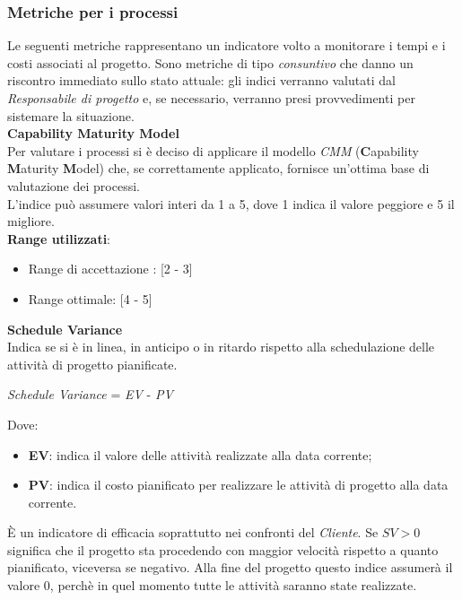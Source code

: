 \subsubsection{Metriche per i processi}\label{MetricheProc}
\hypertarget{metriche_processi}{}
Le seguenti metriche rappresentano un indicatore volto a monitorare i tempi e i costi associati al progetto. Sono metriche di tipo \textit{consuntivo} che danno un riscontro immediato sullo stato attuale: gli indici verranno valutati dal \textit{Responsabile di progetto} e, se necessario, verranno presi provvedimenti per sistemare la situazione.\\

\textbf{Capability Maturity Model}\\

Per valutare i processi si è deciso di applicare il modello \textit{CMM} (\textbf{C}apability \textbf{M}aturity \textbf{M}odel) che, se correttamente applicato, fornisce un'ottima base di valutazione dei processi. \\
L'indice può assumere valori interi da 1 a 5, dove 1 indica il valore peggiore e 5 il migliore.\\

\textbf{Range utilizzati}:
\begin{itemize}
	\item Range di accettazione : [2 - 3]
	\item Range ottimale: [4 - 5]
\end{itemize}

\textbf{Schedule Variance}\\

Indica se si è in linea, in anticipo o in ritardo rispetto alla schedulazione delle attività di progetto
pianificate.
\begin{center}
	\textit{Schedule Variance} = \textit{EV} - \textit{PV} 
\end{center}
Dove:
\begin{itemize}
	\item \textbf{EV}: indica il valore delle attivit\`a realizzate alla data corrente;
	\item \textbf{PV}: indica il costo pianificato per realizzare le attività di progetto alla data corrente.
\end{itemize}
\`E un indicatore di efficacia soprattutto nei confronti del \textit{Cliente}. Se \begin{math}{SV > 0}\end{math} significa che il progetto sta procedendo con maggior velocit\`a rispetto a quanto pianificato, viceversa se negativo. Alla fine del progetto questo indice assumer\`a il valore 0, perch\`e in quel momento tutte le attivit\`a saranno state realizzate.\\

